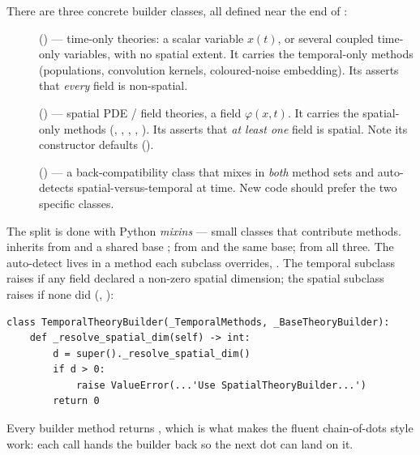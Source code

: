 There are three concrete builder classes, all defined near the end of
:

\begin{description}
  \item[] () ---
        time-only theories: a scalar variable $x(t)$, or several coupled
        time-only variables, with no spatial extent. It carries the
        temporal-only methods (populations, convolution kernels, coloured-noise
        embedding). Its  asserts that \emph{every} field is
        non-spatial.
  \item[] () --- spatial
        PDE / field theories, a field $\varphi(x,t)$. It carries the spatial-only
        methods (, , ,
        , ). Its  asserts
        that \emph{at least one} field is spatial. Note its constructor defaults
         ().
  \item[] () --- a
        back-compatibility class that mixes in \emph{both} method sets and
        auto-detects spatial-versus-temporal at  time. New code
        should prefer the two specific classes.
\end{description}

The split is done with Python \emph{mixins} --- small classes that contribute
methods.  inherits from  and a
shared base ;  from
 and the same base;  from all three.
The auto-detect lives in a method each subclass overrides,
. The temporal subclass raises if any field declared
a non-zero spatial dimension; the spatial subclass raises if none did
(, ):

\begin{lstlisting}
class TemporalTheoryBuilder(_TemporalMethods, _BaseTheoryBuilder):
    def _resolve_spatial_dim(self) -> int:
        d = super()._resolve_spatial_dim()
        if d > 0:
            raise ValueError(...'Use SpatialTheoryBuilder...')
        return 0
\end{lstlisting}

Every builder method returns , which is what makes the fluent
chain-of-dots style work: each call hands the builder back so the next dot can
land on it.

